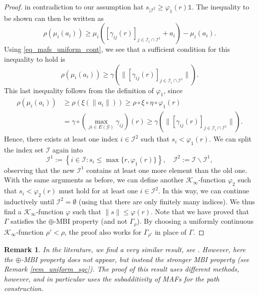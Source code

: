 \documentclass[10pt, oneside, a4paper]{article}
\newcommand{\unit}{\mathds{1}}
\newcommand{\GC}{\mathcal{G}}
\newcommand{\IC}{\mathcal{I}}
\newcommand{\KC}{\mathcal{K}}
\newtheorem{remark}{Remark}[section]
\begin{document}
\begin{proof}
in contradiction to our assumption hat $s_{|\IC^2} \geq \varphi_1(r)\unit$. The inequality to be shown can then be written as%
\begin{equation*}
  \rho(\mu_i(a_i)) \geq \mu_i([\gamma_{ij}(r)]_{j \in \IC_i \cap \IC^1} + a_i) - \mu_i(a_i).%
\end{equation*}
Using \eqref{eq_mafs_uniform_cont}, we see that a sufficient condition for this inequality to hold is%
\begin{equation*}
  \rho(\mu_i(a_i)) \geq \gamma( \|[\gamma_{ij}(r)]_{j \in \IC_i \cap \IC^1}\| ).%
\end{equation*}
This last inequality follows from the definition of $\varphi_1$, since%
\begin{align*}
  \rho(\mu_i(a_i)) &\geq \rho(\xi(\|a_i\|)) \geq \rho \circ \xi \circ \eta \circ \varphi_1(r) \\
	                 &= \gamma \circ \left(\max_{ji \in E(\GC)}\gamma_{ij}\right)(r) \geq \gamma( \|[\gamma_{ij}(r)]_{j \in \IC_i \cap \IC^1}\| ).%
\end{align*}
Hence, there exists at least one index $i \in \IC^2$ such that $s_i  < \varphi_1(r)$. We can split the index set $\IC$ again into%
\begin{equation*}
  \IC^1 := \left\{ i \in \IC : s_i \leq \max\{r,\varphi_1(r)\} \right\},\quad \IC^2 := \IC \backslash \IC^1,%
\end{equation*}
observing that the new $\IC^1$ contains at least one more element than the old one. With the same arguments as before, we can define another $\KC_{\infty}$-function $\varphi_2$ such that $s_i < \varphi_2(r)$ must hold for at least one $i \in \IC^2$. In this way, we can continue inductively until $\IC^2 = \emptyset$ (using that there are only finitely many indices). We thus find a $\KC_{\infty}$-function $\varphi$ such that $\|s\| \leq \varphi(r)$. Note that we have proved that $\Gamma$ satisfies the $\oplus$-MBI property (and not $\Gamma_{\rho}$). By choosing a uniformly continuous $\KC_{\infty}$-function $\rho' < \rho$, the proof also works for $\Gamma_{\rho'}$ in place of $\Gamma$.
\end{proof}

\begin{remark}
In the literature, we find a very similar result, see \cite[Thm.~C.41]{Mir}. However, here the $\oplus$-MBI property does not appear, but instead the stronger MBI property (see Remark \ref{rem_uniform_sgc}). The proof of this result uses different methods, however, and in particular uses the subadditivity of MAFs for the path construction.
\end{remark}
\end{document}
